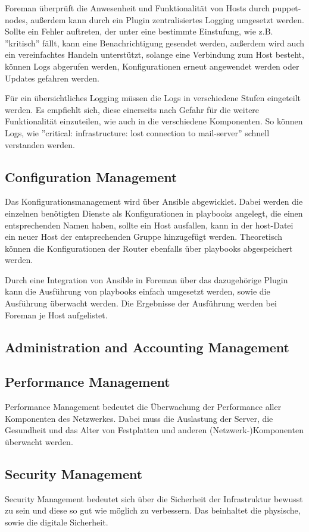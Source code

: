 Foreman überprüft die Anwesenheit und Funktionalität von Hosts durch puppet-nodes, außerdem kann durch ein Plugin zentralisiertes Logging umgesetzt werden. Sollte ein Fehler auftreten, der unter eine bestimmte Einstufung, wie z.B. ''kritisch'' fällt, kann eine Benachrichtigung gesendet werden, außerdem wird auch ein vereinfachtes Handeln unterstützt, solange eine Verbindung zum Host besteht, können Logs abgerufen werden, Konfigurationen erneut angewendet werden oder Updates gefahren werden.

Für ein übersichtliches Logging müssen die Logs in verschiedene Stufen eingeteilt werden. Es empfiehlt sich, diese einerseits nach Gefahr für die weitere Funktionalität einzuteilen, wie auch in die verschiedene Komponenten. So können Logs, wie ''critical: infrastructure: lost connection to mail-server'' schnell verstanden werden.

\subsection{Configuration Management}
Das Konfigurationsmanagement wird über Ansible abgewicklet. Dabei werden die einzelnen benötigten Dienste als Konfigurationen in playbooks angelegt, die einen entsprechenden Namen haben, sollte ein Host ausfallen, kann in der host-Datei ein neuer Host der entsprechenden Gruppe hinzugefügt werden. Theoretisch können die Konfigurationen der Router ebenfalls über playbooks abgespeichert werden. 

Durch eine Integration von Ansible in Foreman über das dazugehörige Plugin kann die Ausführung von playbooks einfach umgesetzt werden, sowie die Ausführung überwacht werden. Die Ergebnisse der Ausführung werden bei Foreman je Host aufgelistet.

\subsection{Administration and Accounting Management}

\subsection{Performance Management}
Performance Management bedeutet die Überwachung der Performance aller Komponenten des Netzwerkes. Dabei muss die Auslastung der Server, die Gesundheit und das Alter von Festplatten und anderen (Netzwerk-)Komponenten überwacht werden.

\subsection{Security Management}
Security Management bedeutet sich über die Sicherheit der Infrastruktur bewusst zu sein und diese so gut wie möglich zu verbessern. Das beinhaltet die physische, sowie die digitale Sicherheit.

